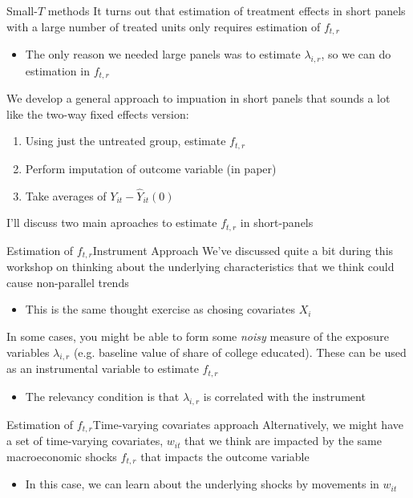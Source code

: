 \documentclass[t]{beamer}
\begin{document}
\begin{frame}{Small-$T$ methods}
  It turns out that estimation of treatment effects in short panels with a large number of treated units only requires estimation of $f_{t,r}$
  \begin{itemize}
    \item The only reason we needed large panels was to estimate $\lambda_{i, r}$, so we can do estimation in $f_{t,r}$
  \end{itemize}

  \pause
  \bigskip
  We develop a general approach to impuation in short panels that sounds a lot like the two-way fixed effects version:
  \begin{enumerate}
    \item Using just the untreated group, estimate $f_{t,r}$
    \item Perform imputation of outcome variable (in paper)
    \item Take averages of $Y_{it} - \hat{Y}_{it}(0)$
  \end{enumerate}

  I'll discuss two main aproaches to estimate $f_{t,r}$ in short-panels
\end{frame}

\begin{frame}{Estimation of $f_{t,r}$}{Instrument Approach}
  We've discussed quite a bit during this workshop on thinking about the underlying characteristics that we think could cause non-parallel trends
  \begin{itemize}
    \item This is the same thought exercise as chosing covariates $X_i$
  \end{itemize}

  \pause
  \bigskip
  In some cases, you might be able to form some \emph{noisy} measure of the exposure variables $\lambda_{i,r}$ (e.g. baseline value of share of college educated). These can be used as an instrumental variable to estimate $f_{t,r}$
  \begin{itemize}
    \item The relevancy condition is that $\lambda_{i,r}$ is correlated with the instrument
  \end{itemize}
\end{frame}

\begin{frame}{Estimation of $f_{t,r}$}{Time-varying covariates approach}
  Alternatively, we might have a set of time-varying covariates, $w_{it}$ that we think are impacted by the same macroeconomic shocks $f_{t,r}$ that impacts the outcome variable

  \begin{itemize}
    \item In this case, we can learn about the underlying shocks by movements in $w_{it}$
  \end{itemize}
\end{frame}
\end{document}
